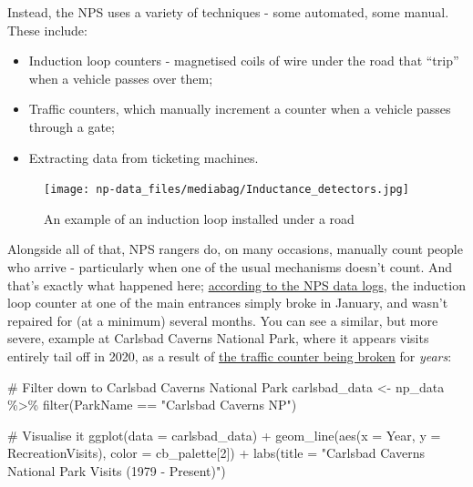 \documentclass[
  letterpaper,
  DIV=11,
  numbers=noendperiod]{scrartcl}
\newenvironment{Shaded}{\begin{snugshade}}{\end{snugshade}}
\newcommand{\AttributeTok}[1]{\textcolor[rgb]{0.40,0.45,0.13}{#1}}
\newcommand{\CommentTok}[1]{\textcolor[rgb]{0.37,0.37,0.37}{#1}}
\newcommand{\DecValTok}[1]{\textcolor[rgb]{0.68,0.00,0.00}{#1}}
\newcommand{\FunctionTok}[1]{\textcolor[rgb]{0.28,0.35,0.67}{#1}}
\newcommand{\NormalTok}[1]{\textcolor[rgb]{0.00,0.23,0.31}{#1}}
\newcommand{\OtherTok}[1]{\textcolor[rgb]{0.00,0.23,0.31}{#1}}
\newcommand{\SpecialCharTok}[1]{\textcolor[rgb]{0.37,0.37,0.37}{#1}}
\newcommand{\StringTok}[1]{\textcolor[rgb]{0.13,0.47,0.30}{#1}}
\providecommand{\tightlist}{%
  \setlength{\itemsep}{0pt}\setlength{\parskip}{0pt}}\usepackage{longtable,booktabs,array}
\begin{document}
Instead, the NPS uses a variety of techniques - some automated, some
manual. These include:

\begin{itemize}
\tightlist
\item
  Induction loop counters - magnetised coils of wire under the road that
  ``trip'' when a vehicle passes over them;
\item
  Traffic counters, which manually increment a counter when a vehicle
  passes through a gate;
\item
  Extracting data from ticketing machines.
\end{itemize}

\begin{figure}[H]

{\centering \texttt{[image: np-data\_files/mediabag/Inductance\_detectors.jpg]}

}

\caption{An example of an induction loop installed under a road}

\end{figure}%

Alongside all of that, NPS rangers do, on many occasions, manually count
people who arrive - particularly when one of the usual mechanisms
doesn't count. And that's exactly what happened here;
\href{https://irma.nps.gov/Stats/SSRSReports/Park\%20Specific\%20Reports/Monthly\%20Visitation\%20Comments\%20By\%20Park?Park=CRLA}{according
to the NPS data logs}, the induction loop counter at one of the main
entrances simply broke in January, and wasn't repaired for (at a
minimum) several months. You can see a similar, but more severe, example
at Carlsbad Caverns National Park, where it appears visits entirely tail
off in 2020, as a result of
\href{https://irma.nps.gov/Stats/SSRSReports/Park\%20Specific\%20Reports/Monthly\%20Visitation\%20Comments\%20By\%20Park?Park=CRLA}{the
traffic counter being broken} for \emph{years}:

\begin{Shaded}
\begin{Highlighting}[]
\CommentTok{\# Filter down to Carlsbad Caverns National Park}
\NormalTok{carlsbad\_data }\OtherTok{\textless{}{-}}\NormalTok{ np\_data }\SpecialCharTok{\%\textgreater{}\%} \FunctionTok{filter}\NormalTok{(ParkName }\SpecialCharTok{==} \StringTok{"Carlsbad Caverns NP"}\NormalTok{)}

\CommentTok{\# Visualise it}
\FunctionTok{ggplot}\NormalTok{(}\AttributeTok{data =}\NormalTok{ carlsbad\_data) }\SpecialCharTok{+} 
  \FunctionTok{geom\_line}\NormalTok{(}\FunctionTok{aes}\NormalTok{(}\AttributeTok{x =}\NormalTok{ Year, }\AttributeTok{y =}\NormalTok{ RecreationVisits), }\AttributeTok{color =}\NormalTok{ cb\_palette[}\DecValTok{2}\NormalTok{]) }\SpecialCharTok{+} 
  \FunctionTok{labs}\NormalTok{(}\AttributeTok{title =} \StringTok{"Carlsbad Caverns National Park Visits (1979 {-} Present)"}\NormalTok{)}
\end{Highlighting}
\end{Shaded}
\end{document}
